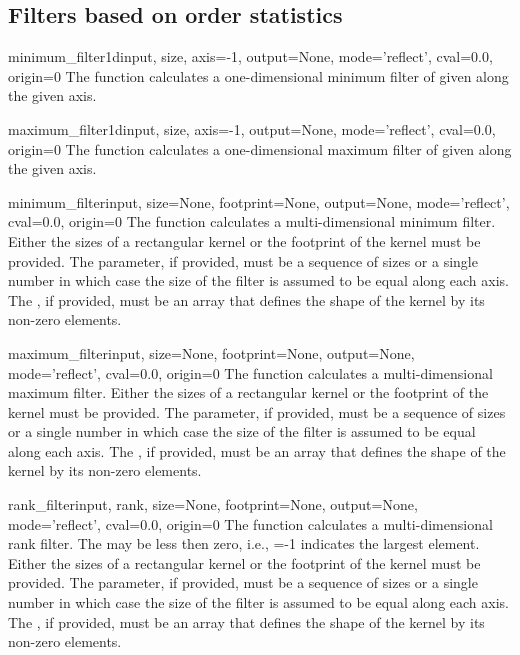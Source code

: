 \subsection{Filters based on order statistics}

\begin{funcdesc}{minimum_filter1d}{input, size, axis=-1, output=None, 
    mode='reflect', cval=0.0, origin=0} The 
  function calculates a one-dimensional minimum filter of given 
  along the given axis.
\end{funcdesc}

\begin{funcdesc}{maximum_filter1d}{input, size, axis=-1, output=None, 
    mode='reflect', cval=0.0, origin=0} The 
  function calculates a one-dimensional maximum filter of given 
  along the given axis.
\end{funcdesc}

\begin{funcdesc}{minimum_filter}{input,  size=None, footprint=None, 
    output=None, mode='reflect', cval=0.0, origin=0} The
   function calculates a multi-dimensional minimum
  filter. Either the sizes of a rectangular kernel or the footprint of the
  kernel must be provided. The  parameter, if provided, must be a
  sequence of sizes or a single number in which case the size of the filter 
  is assumed to be equal along each axis. The , if provided, 
  must be an array that defines the shape of the kernel by its non-zero 
  elements.
\end{funcdesc}

\begin{funcdesc}{maximum_filter}{input,  size=None, footprint=None, 
    output=None, mode='reflect', cval=0.0, origin=0} The
   function calculates a multi-dimensional maximum
  filter. Either the sizes of a rectangular kernel or the footprint of the
  kernel must be provided. The  parameter, if provided, must be a
  sequence of sizes or a single number in which case the size of the filter 
  is assumed to be equal along each axis. The , if provided, 
  must be an array that defines the shape of the kernel by its non-zero 
  elements.
\end{funcdesc}

\begin{funcdesc}{rank_filter}{input, rank, size=None, footprint=None,
  output=None, mode='reflect', cval=0.0, origin=0} The 
  function calculates a multi-dimensional rank filter.  The  may 
  be less then zero, i.e., =-1 indicates the largest element. 
  Either the sizes of a rectangular kernel or the footprint of the kernel 
  must be provided. The  parameter, if provided, must be a 
  sequence of sizes or a single number in which case the size of the filter 
  is assumed to be equal along each axis. The , if provided, 
  must be an array that defines the shape of the kernel by its non-zero 
  elements.
\end{funcdesc}

